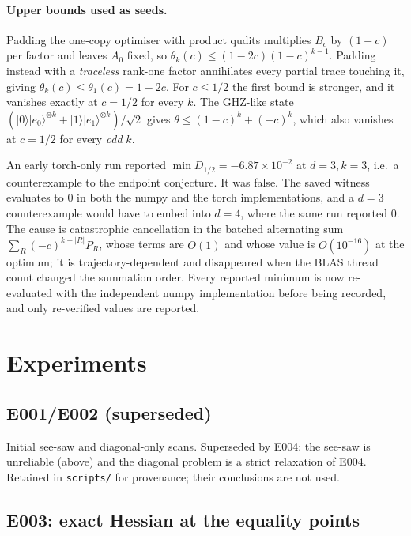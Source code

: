 \documentclass[11pt]{article}
\theoremstyle{definition}
\theoremstyle{plain}
\begin{document}
\paragraph{Upper bounds used as seeds.} Padding the one-copy optimiser with product qudits
multiplies $B_c$ by $(1-c)$ per factor and leaves $A_0$ fixed, so
$\theta_k(c)\le(1-2c)(1-c)^{k-1}$. Padding instead with a \emph{traceless} rank-one factor
annihilates every partial trace touching it, giving $\theta_k(c)\le\theta_1(c)=1-2c$. For
$c\le1/2$ the first bound is stronger, and it vanishes exactly at $c=1/2$ for every $k$.
The GHZ-like state $(|0\rangle|e_0\rangle^{\otimes k}+|1\rangle|e_1\rangle^{\otimes k})/\sqrt2$
gives $\theta\le(1-c)^k+(-c)^k$, which also vanishes at $c=1/2$ for every \emph{odd} $k$.

\begin{tcolorbox}[colback=red!4,colframe=red!40,title=Recorded failure mode]
An early torch-only run reported $\min D_{1/2}=-6.87\times10^{-2}$ at $d=3,k=3$, i.e.\ a
counterexample to the endpoint conjecture. It was false. The saved witness evaluates to
$0$ in both the numpy and the torch implementations, and a $d=3$ counterexample would have
to embed into $d=4$, where the same run reported $0$. The cause is catastrophic
cancellation in the batched alternating sum $\sum_R(-c)^{k-|R|}P_R$, whose terms are
$O(1)$ and whose value is $O(10^{-16})$ at the optimum; it is trajectory-dependent and
disappeared when the BLAS thread count changed the summation order. Every reported
minimum is now re-evaluated with the independent numpy implementation before being
recorded, and only re-verified values are reported.
\end{tcolorbox}

\section{Experiments}

\subsection*{E001/E002 (superseded)}
Initial see-saw and diagonal-only scans. Superseded by E004: the see-saw is unreliable
(above) and the diagonal problem is a strict relaxation of E004. Retained in
\texttt{scripts/} for provenance; their conclusions are not used.

\subsection*{E003: exact Hessian at the equality points}
\end{document}
